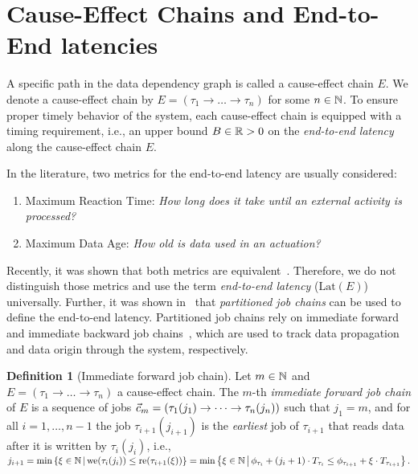 \documentclass[10pt,conference]{resources/IEEEtran}
\theoremstyle{definition}
\theoremstyle{remark}
\newcommand{\lat}{\mathrm{Lat}}
\newcommand{\fc}{\fw{c}}
\theoremstyle{definition}
\newtheorem{definition}{Definition}
\begin{document}
\section{Cause-Effect Chains and End-to-End latencies}

	A specific path in the data dependency graph is called a cause-effect chain $E$.
	We denote a cause-effect chain by $E=(\tau_1 \to \dots \to \tau_n)$ for some $n\in \mathbb{N}$.
%
	To ensure proper timely behavior of the system, each cause-effect chain is equipped with a timing requirement, i.e., an upper bound $B \in \mathbb{R}>0$ on the \emph{end-to-end latency} along the cause-effect chain $E$.

	In the literature, two metrics for the end-to-end latency are usually considered:
	\begin{enumerate}
		\item Maximum Reaction Time: \emph{How long does it take until an external activity is processed?}
		\item Maximum Data Age: \emph{How old is data used in an actuation?}
	\end{enumerate}
	Recently, it was shown that both metrics are equivalent~\cite{DBLP:conf/ecrts/GunzelTCBC23}.
	Therefore, we do not distinguish those metrics and use the term \emph{end-to-end latency} ($\lat(E)$) universally.
	Further, it was shown in~\cite{DBLP:conf/ecrts/GunzelTCBC23} that \emph{partitioned job chains} can be used to define the end-to-end latency.
	Partitioned job chains rely on immediate forward and immediate backward job chains~\cite{duerrCASES}, which are used to track data propagation and data origin through the system, respectively.

	\begin{definition}[Immediate forward job chain]
		Let $m\in \mathbb{N}$ and $E=(\tau_1\to \dots \to \tau_n)$ a cause-effect chain.
		The $m$-th \emph{immediate forward job chain} of $E$ is a sequence of jobs 
		\begin{math}
			\fc_m = (\tau_1(j_1) \to \dots \to \tau_n(j_n))
		\end{math}
		such that $j_1 = m$, and for all $i=1,\dots, n{-}1$ the job $\tau_{i+1}(j_{i+1})$ is the \emph{earliest} job of $\tau_{i+1}$ that reads data after it is written by $\tau_{i}(j_i)$, i.e., 
		\begin{math}
			j_{i+1} = \min \left\{\xi \in \mathbb{N} \,\middle|\, 
			\operatorname{we}(\tau_i(j_i)) \leq 
			\operatorname{re}(\tau_{i+1}(\xi))
			\right\}
			= \min \left\{\xi \in \mathbb{N} \,\middle|\, 
			\phi_{\tau_i} + (j_i +1) \cdot T_{\tau_i} \leq 
			\phi_{\tau_{i+1}} + \xi \cdot T_{\tau_{i+1}}\right\}.
		\end{math}
	\end{definition}
\end{document}
